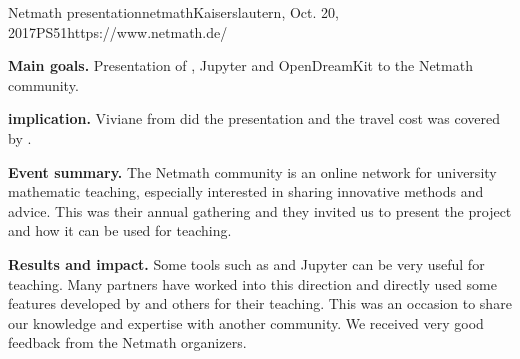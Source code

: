 \begin{event}{Netmath presentation}{netmath}{Kaiserslautern, Oct. 20, 2017}{PS}{5}{1}{https://www.netmath.de/}

\textbf{Main goals.} Presentation of \Sage, Jupyter and OpenDreamKit to the Netmath community.

\textbf{\ODK implication.} Viviane from \ODK did the presentation and the travel cost was covered by \ODK.

\textbf{Event summary.} The Netmath community is an online network for university mathematic teaching, especially interested in sharing innovative methods and advice. This was their annual gathering and they invited us to present the project and how it can be used for teaching.

\textbf{Results and impact.} Some \ODK tools such as \Sage and Jupyter can be very useful for teaching. Many \ODK partners have worked into this direction and directly used some features developed by \ODK and others for their teaching. This was an occasion to share our knowledge and expertise with another community. We received very good feedback from the Netmath organizers.


\end{event}
